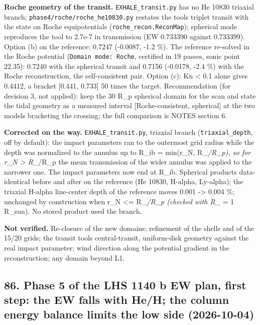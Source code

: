 \documentclass[english,a4paper]{my_memo}
\begin{document}
\textbf{Roche geometry of the transit.} \texttt{EXHALE\_transit.py} has no He 10830
triaxial branch; \texttt{phase4/roche/roche\_he10830.py} restates the tool\textquotesingle s triplet
transit with the state on Roche equipotentials (\texttt{roche\_recon.ReconMap});
spherical mode reproduces the tool to 2.7e-7 in transmission (EW 0.733390
against 0.733399). Option (b) on the reference: 0.7247 (-0.0087, -1.2 \%).
The reference re-solved in the Roche potential (\texttt{Domain\ mode:\ Roche},
certified in 19 passes, sonic point 22.35): 0.7240 with the spherical
transit and 0.7156 (-0.0178, -2.4 \%) with the Roche reconstruction, the
self-consistent pair. Option (c): Kn \textless{} 0.1 alone gives 0.4412, a bracket
{[}0.441, 0.733{]} 50 times the target. Recommendation (for decision 3, not
applied): keep the 30 R\_p spherical domain for the scan and state the tidal
geometry as a measured interval {[}Roche-consistent, spherical{]} at the two
models bracketing the crossing; the full comparison is NOTES section 6.

\textbf{Corrected on the way.} \texttt{EXHALE\_transit.py}, triaxial branch
(\texttt{triaxial\_depth}, off by default): the impact parameters ran to the
outermost grid radius while the depth was normalized to the annulus up to
R\_ib = min(r\_N, R\_\emph{/R\_p), so for r\_N \textgreater{} R\_}/R\_p the mean transmission of the
wider annulus was applied to the narrower one. The impact parameters now end
at R\_ib. Spherical products data-identical before and after on the
reference (He 10830, H-alpha, Ly-alpha); the triaxial H-alpha line-center
depth of the reference moves 0.001 -\textgreater{} 0.004 \%; unchanged by construction
when r\_N \textless= R\_\emph{/R\_p (checked with R\_} = 1 R\_sun). No stored product used
the branch.

\textbf{Not verified.} Re-closure of the new domains; refinement of the shells
and of the 15/20 grids; the transit tool\textquotesingle s central-transit, uniform-disk
geometry against the real impact parameter; wind direction along the
potential gradient in the reconstruction; any domain beyond L1.

\subsection{86. Phase 5 of the LHS 1140 b EW plan, first step: the EW falls with He/H; the column energy balance limits the low side (2026-10-04)}\label{86-phase-5-of-the-lhs-1140-b-ew-plan-first-step-the-ew-falls-with-heh-the-column-energy-balance-limits-the-low-side-2026-10-04}
\end{document}
